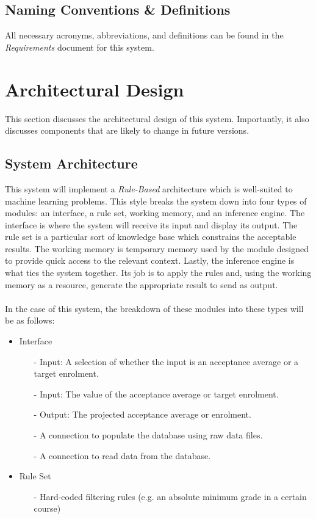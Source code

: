\documentclass[titlepage]{article}
\begin{document}
\subsection{Naming Conventions \& Definitions}
All necessary acronyms, abbreviations, and definitions can be found in the \textit{Requirements} document for this system.



\section{Architectural Design}
This section discusses the architectural design of this system. Importantly, it also discusses components that are likely to change in future versions.
\subsection{System Architecture}
This system will implement a \textit{Rule-Based} architecture which is well-suited to machine learning problems. This style breaks the system down into four types of modules: an interface, a rule set, working memory, and an inference engine. The interface is where the system will receive its input and display its output. The rule set is a particular sort of knowledge base which constrains the acceptable results. The working memory is temporary memory used by the module designed to provide quick access to the relevant context. Lastly, the inference engine is what ties the system together. Its job is to apply the rules and, using the working memory as a resource, generate the appropriate result to send as output.\\~\\
In the case of this system, the breakdown of these modules into these types will be as follows:\\
\begin{itemize}
	\item Interface
	\begin{itemize}
		\item[-] Input: A selection of whether the input is an acceptance average or a target enrolment.
		\item[-] Input: The value of the acceptance average or target enrolment.
		\item[-] Output: The projected acceptance average or enrolment.
		\item[-] A connection to populate the database using raw data files.
		\item[-] A connection to read data from the database.
	\end{itemize}
	\item Rule Set
	\begin{itemize}
		\item[-] Hard-coded filtering rules (e.g. an absolute minimum grade in a certain course)
	\end{itemize}
\end{itemize}
\end{document}
